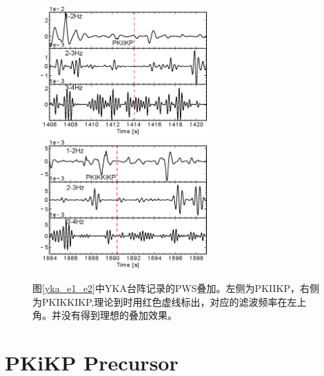 \begin{figure}[!ht]
	\centering
	\includegraphics[width=7cm,height=5cm]{fig/chap3/yka_e1_pws.eps}
	\hspace{1em}
	\includegraphics[width=7cm,height=5cm]{fig/chap3/yka_e2_pws.eps}
	\caption{图\ref{yka_e1_e2}中YKA台阵记录的PWS叠加。左侧为PKIIKP，右侧为PKIKKIKP,理论到时用红色虚线标出，对应的滤波频率在左上角。并没有得到理想的叠加效果。}
	\label{yka_pws}
\end{figure}

\newpage

\section{PKiKP Precursor}

